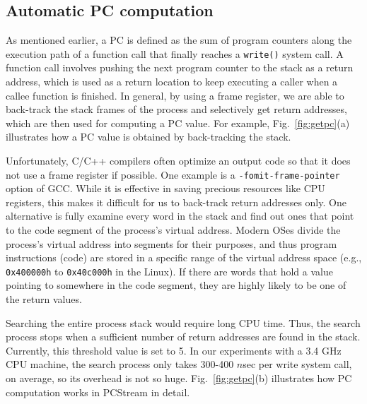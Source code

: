 \vspace{-5pt}
\subsection{Automatic PC computation}
As mentioned earlier, a PC is defined as the sum of program counters along the
execution path of a function call that finally reaches a \texttt{write()}
system call.  A function call involves pushing the next program counter to the
stack as a return address, which is used as a return location to keep
executing a caller when a callee function is finished.  In general, by
using a frame register, we are able to back-track the stack frames of the
process and selectively get return addresses, which are then used for
computing a PC value. For example, Fig.~\ref{fig:getpc}(a) illustrates how a PC
value is obtained by back-tracking the stack.

Unfortunately, C/C++ compilers often optimize an output code so
that it does not use a frame register if possible.  One example is a
{\tt -fomit-frame-pointer} option of GCC. While it is effective in saving
precious resources like CPU registers, this makes it difficult for us to
back-track return addresses only. One alternative is fully examine
every word in the stack and find out ones that point to the code
segment of the process's virtual address.  Modern OSes divide the process's
virtual address into segments for their purposes, and thus program instructions
(code) are stored in a specific range of the virtual address space (e.g.,
{\texttt{0x400000h}} to {\texttt{0x40c000h}} in the
Linux).  If there are words that hold a value pointing to somewhere in the code
segment, they are highly likely to be one of the return values.  

Searching the entire process stack would require long CPU time. Thus, the
search process stops when a sufficient number of return addresses are found in
the stack. Currently, this threshold value is set to 5.  In our experiments
with a 3.4 GHz CPU machine, the search process only takes 300-400 $n$sec per
write system call, on average, so its overhead is not so huge.
Fig.~\ref{fig:getpc}(b) illustrates how PC computation works in {\sf PCStream}
in detail.


